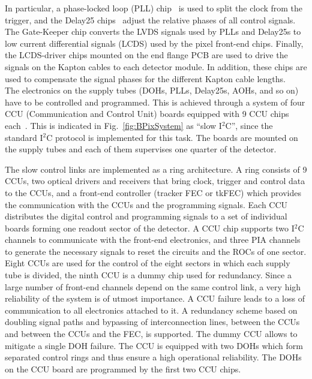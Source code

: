 In particular, a phase-locked loop (PLL) chip~\cite{PLLmanual} is used to split the clock from the trigger, and the Delay25 chips~\cite{Delay25manual} adjust the relative phases of all control signals.
The Gate-Keeper chip converts the LVDS signals used by PLLs and Delay25s to low current differential signals (LCDS) used by the pixel front-end chips.
Finally, the LCDS-driver chips mounted on the end flange PCB are used to drive the signals on the Kapton cables to each detector module.
In addition, these chips are used to compensate the signal phases for the different Kapton cable lengths.\\

The electronics on the supply tubes (DOHs, PLLs, Delay25s, AOHs, and so on) have to be controlled and programmed.
This is achieved through a system of four CCU (Communication and Control Unit) boards equipped with 9 CCU chips each~\cite{Paillard:593914}.
This is indicated in Fig.~\ref{fig:BPixSystem} as ``slow I$^2$C'', since the standard I$^2$C protocol is implemented for this task.
The boards are mounted on the supply tubes and each of them supervises one quarter of the detector.

The slow control links are implemented as a ring architecture.
A ring consists of 9 CCUs, two optical drivers and receivers that bring clock, trigger and control data to the CCUs,
and a front-end controller (tracker FEC or tkFEC)
which provides the communication with the CCUs and the programming signals.
Each CCU distributes the digital control and programming signals to a set of individual boards forming one readout sector of the detector.
A CCU chip supports two I$^2$C channels to communicate with the front-end electronics, and three PIA channels to generate the necessary signals to reset the circuits and the ROCs of one sector.
Eight CCUs are used for the control of the eight sectors in which each supply tube is divided, the ninth CCU is a dummy chip used for redundancy.
Since a large number of front-end channels depend on the same control link, a very high reliability of the system is of utmost importance.
A CCU failure leads to a loss of communication to all electronics attached to it.
A redundancy scheme based on doubling signal paths and bypassing of interconnection lines, between the CCUs and between the CCUs and the FEC, is supported.
The dummy CCU allows to mitigate a single DOH failure. The CCU is equipped with two DOHs which form separated control rings and thus ensure a high operational reliability.
The DOHs on the CCU board are programmed by the first two CCU chips.

